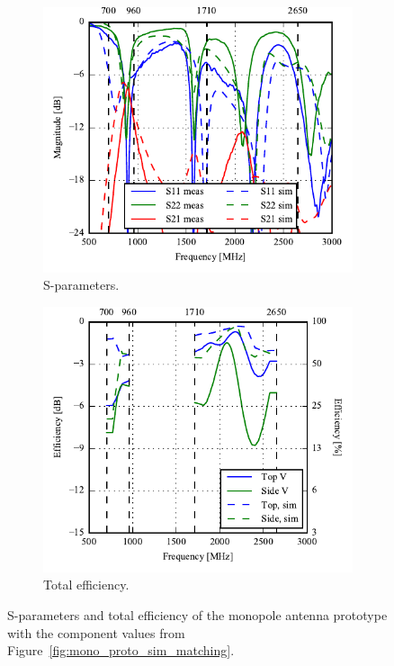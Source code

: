 \begin{figure}[htbp]
    \centering
    \begin{subfigure}{0.49\linewidth}
        \includegraphics{img/tech_sol/monopole/prototype_v2/meas_sim_sparams.pdf}
        \caption{S-parameters.}
    \end{subfigure}
    \hfill
    \begin{subfigure}{0.49\linewidth}
        \includegraphics{img/tech_sol/monopole/prototype_v2/meas_sim_efficiency.pdf}
        \caption{Total efficiency.}
    \end{subfigure}
    \caption{S-parameters and total efficiency of the monopole antenna prototype with the component values from Figure~\ref{fig:mono_proto_sim_matching}.}
    \label{fig:mono_proto_sparam_eff}
\end{figure}

